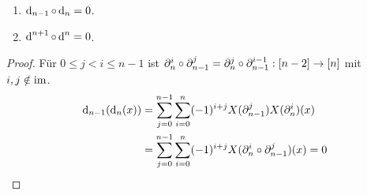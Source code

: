 \begin{lemmea}
  \begin{enumerate}[label=(\alph*)]
    \item $\operatorname{d}_{n-1}\circ \operatorname{d}_n= 0$.
    \item $\operatorname{d}^{n+1}\circ \operatorname{d}^n=0$.
  \end{enumerate}
\end{lemmea}
\begin{proof}
  Für $0\leq j< i\leq n-1$ ist 
  $\partial_n^i\circ \partial_{n-1}^j = \partial_n^j\circ\partial_{n-1}^{i-1}:
  [n-2]\to[n]$ mit $i,j\notin \operatorname{im}$.
  \begin{align*}
    \operatorname{d}_{n-1}(\operatorname{d}_n(x)) &= \sum_{j=0}^{n-1}\sum_{i=0}^n (-1)^{i+j}
     X(\partial_{n-1}^j)X(\partial_n^i)(x) \\
    &= \sum_{j=0}^{n-1}\sum_{i=0}^n (-1)^{i+j} X(\partial_n^i\circ
    \partial_{n-1}^j)(x) = 0
  \end{align*}
\end{proof}
